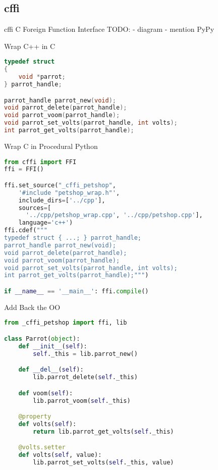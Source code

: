 \documentclass{beamer}
\begin{document}
\subsection{cffi}

\begin{frame}{cffi}
  C Foreign Function Interface
  TODO:
  - diagram
  - mention PyPy
\end{frame}

\begin{frame}[fragile=singleslide]{Wrap C++ in C}
  \begin{lstlisting}[language=c]
typedef struct
{
    void *parrot;
} parrot_handle;

parrot_handle parrot_new(void);
void parrot_delete(parrot_handle);
void parrot_voom(parrot_handle);
void parrot_set_volts(parrot_handle, int volts);
int parrot_get_volts(parrot_handle);
  \end{lstlisting}
\end{frame}

\begin{frame}[fragile=singleslide]{Wrap C in Procedural Python}
  \begin{lstlisting}[language=python]
from cffi import FFI
ffi = FFI()

ffi.set_source("_cffi_petshop",
    '#include "petshop_wrap.h"',
    include_dirs=['../cpp'],
    sources=[
      '../cpp/petshop_wrap.cpp', '../cpp/petshop.cpp'],
    language='c++')
ffi.cdef("""
typedef struct { ...; } parrot_handle;
parrot_handle parrot_new(void);
void parrot_delete(parrot_handle);
void parrot_voom(parrot_handle);
void parrot_set_volts(parrot_handle, int volts);
int parrot_get_volts(parrot_handle);""")

if __name__ == '__main__': ffi.compile()
  \end{lstlisting}
\end{frame}

\begin{frame}[fragile=singleslide]{Add Back the OO}
  \begin{lstlisting}[language=python]
from _cffi_petshop import ffi, lib

class Parrot(object):
    def __init__(self):
        self._this = lib.parrot_new()

    def __del__(self):
        lib.parrot_delete(self._this)

    def voom(self):
        lib.parrot_voom(self._this)

    @property
    def volts(self):
        return lib.parrot_get_volts(self._this)

    @volts.setter
    def volts(self, value):
        lib.parrot_set_volts(self._this, value)
  \end{lstlisting}
\end{frame}
\end{document}
